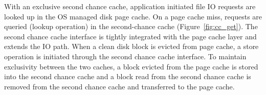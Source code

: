 %

With an exclusive second chance cache, application initiated file IO
requests are looked up in the OS managed disk page cache.
%
On a page cache miss, requests
are queried (lookup operation) in the second-chance cache (Figure~\ref{fig:cc_get}).
%
The second chance cache interface is tightly integrated with the page cache layer
and extends the IO path.
%
When a clean disk block is evicted from page cache, a store operation is
initiated through the second chance cache interface.
%
To maintain exclusivity between the two caches, a block evicted from the
page cache is stored into the second chance cache and a block read from 
the second chance cache is removed from the second chance cache
and transferred to the page cache.

